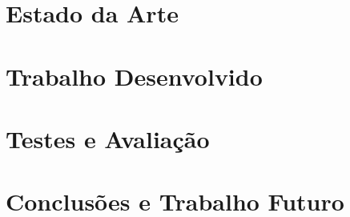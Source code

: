 \documentclass[a4paper, twoside, 12pt]{report}
\makeatletter
\renewcommand*{\cleardoublepage}{\clearpage\if@twoside \ifodd\c@page\else
\hbox{}%
\thispagestyle{empty}%
\newpage%
\if@twocolumn\hbox{}\newpage\fi\fi\fi}
\makeatother
\begin{document}
\chapter{Estado da Arte}
\label{chap:state_of_the_art}


\clearpage \cleardoublepage %

\chapter{Trabalho Desenvolvido}\label{workcharp}


\chapter{Testes e Avaliação}\label{cap4}


\clearpage \cleardoublepage %


\chapter{Conclusões e Trabalho Futuro}



\clearpage \cleardoublepage %







\clearpage \cleardoublepage %


\clearpage %
\renewcommand{\thesection}{Apêndices \Roman{section}}
\end{document}
